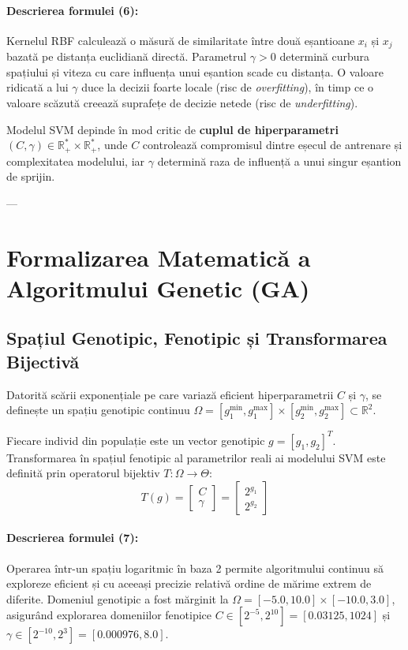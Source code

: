 \documentclass[12pt,a4paper]{report}
\begin{document}
\paragraph{Descrierea formulei (6):}
Kernelul RBF calculează o măsură de similaritate între două eșantioane $x_i$ și $x_j$ bazată pe distanța euclidiană directă. Parametrul $\gamma > 0$ determină curbura spațiului și viteza cu care influența unui eșantion scade cu distanța. O valoare ridicată a lui $\gamma$ duce la decizii foarte locale (risc de \textit{overfitting}), în timp ce o valoare scăzută creează suprafețe de decizie netede (risc de \textit{underfitting}).

Modelul SVM depinde în mod critic de \textbf{cuplul de hiperparametri $(C, \gamma) \in \mathbb{R}_+^* \times \mathbb{R}_+^*$}, unde $C$ controlează compromisul dintre eșecul de antrenare și complexitatea modelului, iar $\gamma$ determină raza de influență a unui singur eșantion de sprijin.

---

\section{Formalizarea Matematică a Algoritmului Genetic (GA)}

\subsection{Spațiul Genotipic, Fenotipic și Transformarea Bijectivă}
Datorită scării exponențiale pe care variază eficient hiperparametrii $C$ și $\gamma$, se definește un spațiu genotipic continuu $\Omega = [g_1^{\min}, g_1^{\max}] \times [g_2^{\min}, g_2^{\max}] \subset \mathbb{R}^2$. 

Fiecare individ din populație este un vector genotipic $g = [g_1, g_2]^T$. Transformarea în spațiul fenotipic al parametrilor reali ai modelului SVM este definită prin operatorul bijektiv $T: \Omega \to \Theta$:
\begin{equation}
T(g) = \begin{bmatrix} C \\ \gamma \end{bmatrix} = \begin{bmatrix} 2^{g_1} \\ 2^{g_2} \end{bmatrix}
\end{equation}

\paragraph{Descrierea formulei (7):}
Operarea într-un spațiu logaritmic în baza 2 permite algoritmului continuu să exploreze eficient și cu aceeași precizie relativă ordine de mărime extrem de diferite. Domeniul genotipic a fost mărginit la $\Omega = [-5.0, 10.0] \times [-10.0, 3.0]$, asigurând explorarea domeniilor fenotipice $C \in [2^{-5}, 2^{10}] = [0.03125, 1024]$ și $\gamma \in [2^{-10}, 2^3] = [0.000976, 8.0]$.
\end{document}
